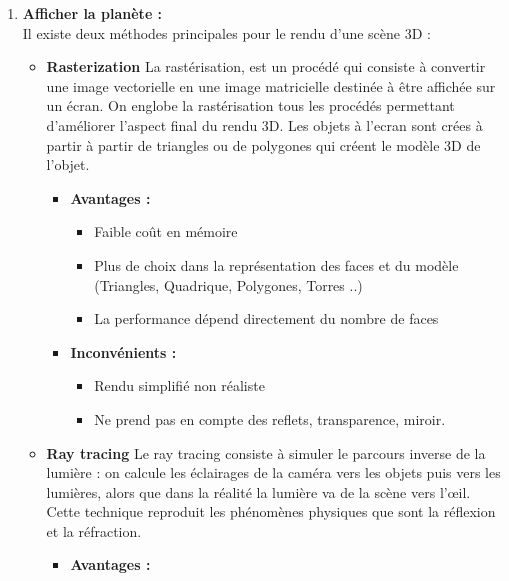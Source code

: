 \documentclass[a4paper]{article}
\begin{document}
\begin{enumerate}
        \item \textbf{Afficher la planète :} \\
        
        Il existe deux méthodes principales pour le rendu d'une scène 3D :
        \begin{itemize}
            \item \textbf{Rasterization}
            La rastérisation, est un procédé qui consiste à convertir une image vectorielle en une image matricielle destinée à être affichée sur un écran. On englobe la rastérisation tous les procédés permettant d'améliorer l'aspect final du rendu 3D.
            Les objets à l'ecran sont crées à partir à partir de triangles ou de polygones qui créent le modèle 3D de l'objet. 
            \begin{itemize}
                \item \textbf{Avantages :}
                \begin{itemize}
                    \item Faible coût en mémoire
                    \item Plus de choix dans la représentation des faces et du modèle (Triangles, Quadrique, Polygones, Torres ..)
                    \item La performance dépend directement du nombre de faces
                \end{itemize}
                \item  \textbf{Inconvénients :}
                \begin{itemize}
                    \item Rendu simplifié non réaliste
                    \item Ne prend pas en compte des reflets, transparence, miroir.
                \end{itemize}
            \end{itemize}
            \item \textbf{Ray tracing}
            Le ray tracing consiste à simuler le parcours inverse de la lumière : on calcule les éclairages de la caméra vers les objets puis vers les lumières, alors que dans la réalité la lumière va de la scène vers l'œil. Cette technique reproduit les phénomènes physiques que sont la réflexion et la réfraction. 
            \begin{itemize}
                \item \textbf{Avantages :}
                \begin{itemize}

\end{itemize}
\end{itemize}
\end{itemize}
\end{enumerate}
\end{document}
